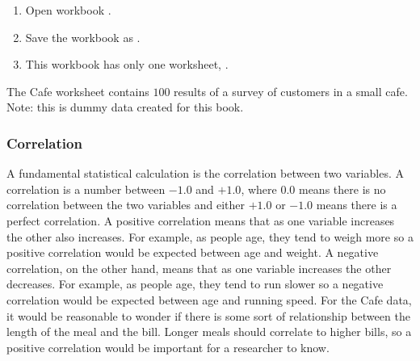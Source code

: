 \begin{enumbox}
	\begin{enumerate}
		\item Open workbook .
		\item Save the workbook as .
		\item This workbook has only one worksheet, .
	\end{enumerate}
\end{enumbox}

The Cafe worksheet contains $ 100 $ results of a survey of customers in a small cafe. Note: this is dummy data created for this book.

\subsubsection{Correlation}

A fundamental statistical calculation is the correlation between two variables. A correlation is a number between $ -1.0 $ and $ +1.0 $, where $ 0.0 $ means there is no correlation between the two variables and either $ +1.0 $ or $ -1.0 $ means there is a perfect correlation. A positive correlation means that as one variable increases the other also increases. For example, as people age, they tend to weigh more so a positive correlation would be expected between age and weight. A negative correlation, on the other hand, means that as one variable increases the other decreases. For example, as people age, they tend to run slower so a negative correlation would be expected between age and running speed. For the Cafe data, it would be reasonable to wonder if there is some sort of relationship between the length of the meal and the bill. Longer meals should correlate to higher bills, so a positive correlation would be important for a researcher to know.

